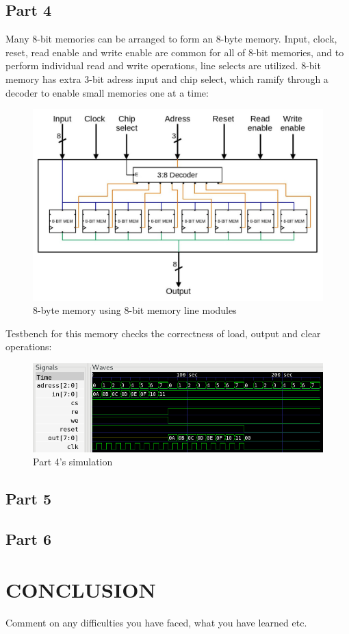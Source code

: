 \documentclass[pdftex,12pt,a4paper]{article}
\begin{document}
\subsection{Part 4}
Many 8-bit memories can be arranged to form an 8-byte memory. Input, clock, reset, read enable and write enable are common for all of 8-bit memories, and to perform individual read and write operations, line selects are utilized. 8-bit memory has extra 3-bit adress input and chip select, which ramify through a decoder to enable small memories one at a time:
\begin{figure}[H]
\includegraphics[width=\textwidth]{part4_diagram.jpg}
\caption{8-byte memory using 8-bit memory line modules}
\end{figure}

Testbench for this memory checks the correctness of load, output and clear operations:

\begin{figure}[H]
\includegraphics[width=\textwidth]{part4_wave.png}
\caption{Part 4's simulation}
\end{figure}

\subsection{Part 5}
\subsection{Part 6}

\section{CONCLUSION}
Comment on any difficulties you have faced, what you have learned etc.
\end{document}
